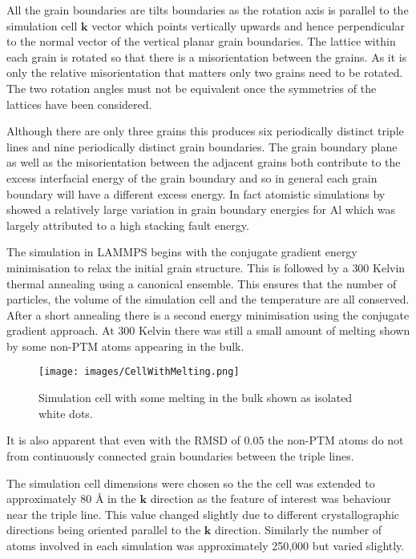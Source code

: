 \documentclass[12pt,a4paper,openany]{report}
\begin{document}
All the grain boundaries are tilts boundaries as the rotation axis is parallel to the simulation cell $\mathbf{k}$ vector which points vertically upwards and hence perpendicular to the normal vector of the vertical planar grain boundaries. The lattice within each grain is rotated so that there is a misorientation between the grains. As it is only the relative misorientation that matters only two grains need to be rotated. The two rotation angles must not be equivalent once the symmetries of the lattices have been considered. 

Although there are only three grains this produces six periodically distinct triple lines and nine periodically distinct grain boundaries. The grain boundary plane as well as the misorientation between the adjacent grains both contribute to the excess interfacial energy of the grain boundary and so in general each grain boundary will have a different excess energy. In fact atomistic simulations by \cite{HOLM2010905} showed a relatively large variation in grain boundary energies for Al which was largely attributed to a high stacking fault energy. 

The simulation in LAMMPS begins with the conjugate gradient energy minimisation to relax the initial grain structure. This is followed by a $300$ Kelvin thermal annealing using a canonical ensemble. This ensures that the number of particles, the volume of the simulation cell and the temperature are all conserved. After a short annealing there is a second energy minimisation using the conjugate gradient approach. At $300$ Kelvin there was still a small amount of melting shown by some non-PTM atoms appearing in the bulk. 

\begin{figure}[H]
	\centering
	\texttt{[image: images/CellWithMelting.png]} 
	\label{fig:CellMelt}
	\caption{Simulation cell with some melting in the bulk shown
	as isolated white dots.}
\end{figure}

It is also apparent that even with the RMSD of $0.05$ the non-PTM atoms do not from continuously connected grain boundaries between the triple lines.

The simulation cell dimensions were chosen so the the cell was extended to approximately $80 \textrm{ \AA}$ in the $\mathbf{k}$ direction as the feature of interest was behaviour near the triple line. This value changed slightly due to different crystallographic directions being oriented parallel to the $\mathbf{k}$ direction. Similarly the number of atoms involved in each simulation was approximately 250,000 but varied slightly.  
\end{document}
